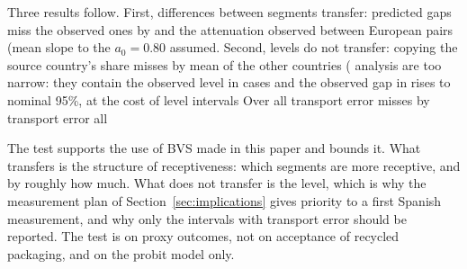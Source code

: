 Three results follow. First, differences between segments transfer: predicted
gaps miss the observed ones by %
and the attenuation observed between European pairs (mean slope
to the $a_0 = 0.80$ assumed. Second, levels do not transfer: copying the source
country's share misses by %
mean of the other countries (%
analysis are too narrow: they contain the observed level in %
cases and the observed gap in %
rises to %
nominal 95\%, at the cost of level intervals %
Over all %
transport error %
misses by %
transport error all %

The test supports the use of BVS made in this paper and bounds it. What
transfers is the structure of receptiveness: which segments are more
receptive, and by roughly how much. What does not transfer is the level, which
is why the measurement plan of Section~\ref{sec:implications} gives priority to
a first Spanish measurement, and why only the intervals with transport error
should be reported. The test is on proxy outcomes, not on acceptance of
recycled packaging, and on the probit model only.

